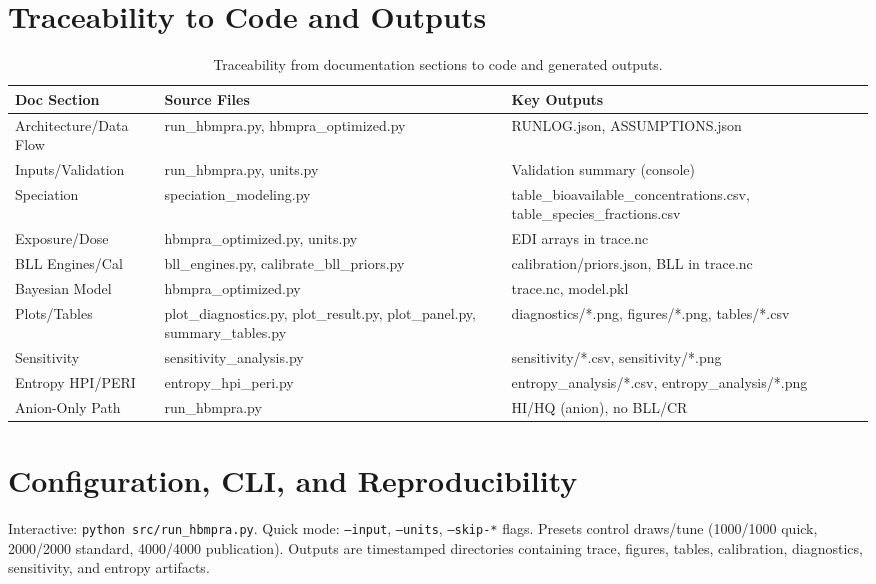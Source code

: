 \documentclass[11pt,a4paper]{article}
\begin{document}
\section{Traceability to Code and Outputs}\label{sec:traceability}
\begin{table}[h]
  \centering
  \begin{tabular}{@{}p{3cm}p{5cm}p{6cm}@{}}\toprule
    Doc Section & Source Files & Key Outputs \\\midrule
    Architecture/Data Flow & run\_hbmpra.py, hbmpra\_optimized.py & RUNLOG.json, ASSUMPTIONS.json \\
    Inputs/Validation & run\_hbmpra.py, units.py & Validation summary (console) \\
    Speciation & speciation\_modeling.py & table\_bioavailable\_concentrations.csv, table\_species\_fractions.csv \\
    Exposure/Dose & hbmpra\_optimized.py, units.py & EDI arrays in trace.nc \\
    BLL Engines/Cal & bll\_engines.py, calibrate\_bll\_priors.py & calibration/priors.json, BLL in trace.nc \\
    Bayesian Model & hbmpra\_optimized.py & trace.nc, model.pkl \\
    Plots/Tables & plot\_diagnostics.py, plot\_result.py, plot\_panel.py, summary\_tables.py & diagnostics/*.png, figures/*.png, tables/*.csv \\
    Sensitivity & sensitivity\_analysis.py & sensitivity/*.csv, sensitivity/*.png \\
    Entropy HPI/PERI & entropy\_hpi\_peri.py & entropy\_analysis/*.csv, entropy\_analysis/*.png \\
    Anion-Only Path & run\_hbmpra.py & HI/HQ (anion), no BLL/CR \\\bottomrule
  \end{tabular}
  \caption{Traceability from documentation sections to code and generated outputs.}
\end{table}

\section{Configuration, CLI, and Reproducibility}\label{sec:repro}
Interactive: \texttt{python src/run\_hbmpra.py}. Quick mode: \texttt{--input}, \texttt{--units}, \texttt{--skip-*} flags. Presets control draws/tune (1000/1000 quick, 2000/2000 standard, 4000/4000 publication). Outputs are timestamped directories containing trace, figures, tables, calibration, diagnostics, sensitivity, and entropy artifacts.
\end{document}

